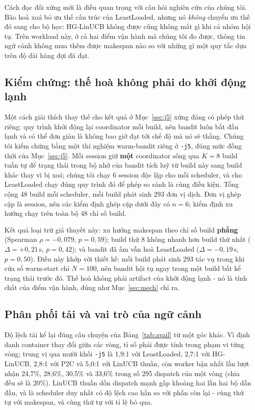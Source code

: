 \documentclass[final,5p,times,twocolumn]{elsarticle}
\begin{document}
Cách đọc đối xứng mới là điều quan trọng với câu hỏi nghiên cứu của chúng tôi. Bão hoà xoá bỏ ưu thế cấu trúc của LeastLoaded, nhưng nó \emph{không} chuyển ưu thế đó sang cho bộ học: HG-LinUCB không được cũng không mất gì khi cả nhóm hội tụ. Trên workload này, ở cả hai điểm vận hành mà chúng tôi đo được, thông tin ngữ cảnh không mua thêm được makespan nào so với những gì một quy tắc dựa trên độ dài hàng đợi đã đạt.

\subsection{Kiểm chứng: thế hoà không phải do khởi động lạnh}
\label{sec:coldstart}

Một cách giải thích thay thế cho kết quả ở Mục~\ref{sec:j5} xứng đáng có phép thử riêng: quy trình khởi động lại coordinator mỗi build, nên bandit luôn bắt đầu lạnh và có thể đơn giản là không bao giờ đạt tới chế độ mà nó sẽ thắng. Chúng tôi kiểm chứng bằng một thí nghiệm warm-bandit riêng ở \texttt{-j5}, đúng mức đồng thời của Mục~\ref{sec:j5}. Mỗi session giữ \textbf{một} coordinator sống qua $K=8$ build tuần tự để trạng thái trong bộ nhớ của bandit tích luỹ từ build này sang build khác thay vì bị xoá; chúng tôi chạy 6 session độc lập cho mỗi scheduler, và cho LeastLoaded chạy đúng quy trình đó để phép so sánh là cùng điều kiện. Tổng cộng 48 build mỗi scheduler, mỗi build phát sinh 293 đơn vị dịch. Đơn vị ghép cặp là session, nên các kiểm định ghép cặp dưới đây có $n=6$; kiểm định xu hướng chạy trên toàn bộ 48 chỉ số build.

Kết quả loại trừ giả thuyết này: xu hướng makespan theo chỉ số build \textbf{phẳng} (Spearman $\rho=-0{,}079$, $p=0{,}59$); build thứ 8 không nhanh hơn build thứ nhất ($\Delta=+0{,}21$\,s, $p=0{,}42$); và bandit đã ấm vẫn hoà LeastLoaded ($\Delta=-0{,}19$\,s, $p=0{,}50$). Điều này khớp với thiết kế: mỗi build phát sinh 293 tác vụ trong khi cửa sổ warm-start chỉ $N=100$, nên bandit hội tụ ngay trong một build bất kể trạng thái trước đó. Thế hoà không phải artifact của khởi động lạnh - nó là tính chất của điểm vận hành, đúng như Mục~\ref{sec:mech} chỉ ra.

\subsection{Phân phối tải và vai trò của ngữ cảnh}
\label{sec:skew}

Độ lệch tải kể lại đúng câu chuyện của Bảng~\ref{tab:avail} từ một góc khác. Vì định danh container thay đổi giữa các vòng, tỉ số phải được tính trong phạm vi từng vòng; trung vị qua mười khối \texttt{-j5} là 1,9:1 với LeastLoaded, 2,7:1 với HG-LinUCB, 2,8:1 với P2C và 5,0:1 với LinUCB thuần, còn worker bận nhất lần lượt nhận 24,7\%, 28,6\%, 30,5\% và 33,6\% trong số 295 dispatch của một vòng (chia đều sẽ là 20\%). LinUCB thuần dồn dispatch mạnh gấp khoảng hai lần hai bộ dẫn đầu, và là scheduler duy nhất có độ lệch cao hẳn so với phần còn lại - cùng thứ tự với makespan, và cùng thứ tự với tỉ lệ bỏ qua.
\end{document}
